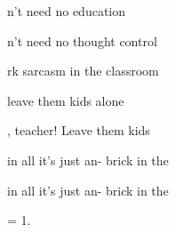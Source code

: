 

\zs
{}n’t need no education

n’t need no thought control

rk sarcasm in the classroom

 leave them kids alone 
\ks

\zr
{}, teacher! Leave them kids           

 in all it's just an- brick in the 

 in all it's just an- brick in the 
\kr

\zs
= 1.
\ks

\zr
\kr

\kp





